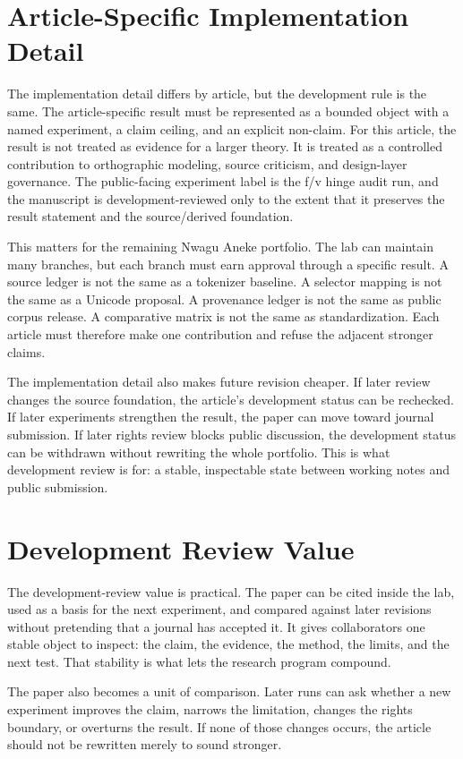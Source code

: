 \documentclass[sigconf,nonacm]{acmart}
\begin{document}
\section{Article-Specific Implementation Detail}
The implementation detail differs by article, but the development rule is the same.
The article-specific result must be represented as a bounded object with a named
experiment, a claim ceiling, and an explicit non-claim. For this article, the
result is not treated as evidence for a larger theory. It is treated as a
controlled contribution to orthographic modeling, source criticism, and design-layer governance. The public-facing experiment label is the f/v hinge audit run, and the manuscript is development-reviewed only to the extent that it preserves the result
statement and the source/derived foundation.

This matters for the remaining Nwagu Aneke portfolio. The lab can maintain many
branches, but each branch must earn approval through a specific result. A source
ledger is not the same as a tokenizer baseline. A selector mapping is not the
same as a Unicode proposal. A provenance ledger is not the same as public corpus
release. A comparative matrix is not the same as standardization. Each article
must therefore make one contribution and refuse the adjacent stronger claims.

The implementation detail also makes future revision cheaper. If later review
changes the source foundation, the article's development status can be
rechecked. If later experiments strengthen the result, the paper can move toward
journal submission. If later rights review blocks public discussion, the
development status can be withdrawn without rewriting the whole portfolio. This
is what development review is for: a stable, inspectable state between working
notes and public submission.

\section{Development Review Value}
The development-review value is practical. The paper can be cited inside the lab,
used as a basis for the next experiment, and compared against later revisions
without pretending that a journal has accepted it. It gives collaborators one
stable object to inspect: the claim, the evidence, the method, the limits, and
the next test. That stability is what lets the research program compound.

The paper also becomes a unit of comparison. Later runs can ask whether a new
experiment improves the claim, narrows the limitation, changes the rights
boundary, or overturns the result. If none of those changes occurs, the article
should not be rewritten merely to sound stronger.
\end{document}
